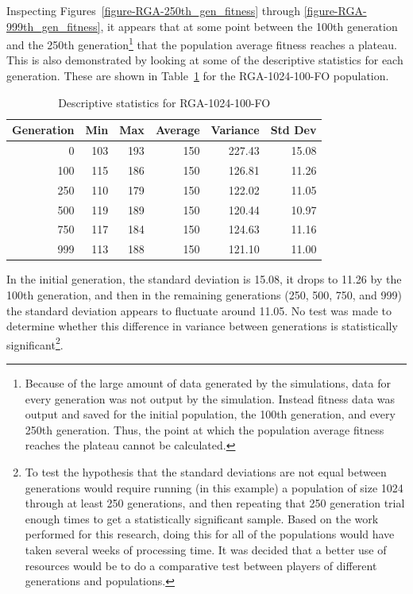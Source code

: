 Inspecting Figures~\ref{figure-RGA-250th_gen_fitness} through
\ref{figure-RGA-999th_gen_fitness}, it appears that at some point between the
100th generation and the 250th generation\footnote{Because of the large amount
of data generated by the simulations, data for every generation was not output
by the simulation. Instead fitness data was output and saved for the initial
population, the 100th generation, and every 250th generation. Thus, the point at
which the population average fitness reaches the plateau cannot be calculated.}
that the population average fitness reaches a plateau. This is also demonstrated
by looking at some of the descriptive statistics for each generation. These are
shown in Table~\ref{table-stats-for-s1024-n100-fo} for the RGA-1024-100-FO
population.

\begin{table}[ht]
\begin{center}
\caption[RGA-1024-100-FO statistics]{Descriptive statistics for RGA-1024-100-FO}
\begin{tabular}{ | r || r | r | r | r | r |}
\hline
Generation & Min & Max & Average & Variance & Std Dev \\ \hline \hline
0   & 103 & 193 & 150 & 227.43 & 15.08 \\ 
100 & 115 & 186 & 150 & 126.81 & 11.26 \\ 
250 & 110 & 179 & 150 & 122.02 & 11.05 \\ 
500 & 119 & 189 & 150 & 120.44 & 10.97 \\ 
750 & 117 & 184 & 150 & 124.63 & 11.16 \\ 
999 & 113 & 188 & 150 & 121.10 & 11.00 \\ \hline
\end{tabular}
\label{table-stats-for-s1024-n100-fo}
\end{center}
\end{table}

In the initial generation, the standard deviation is 15.08, it drops to 11.26 by
the 100th generation, and then in the remaining generations (250, 500, 750, and
999) the standard deviation appears to fluctuate around 11.05. No test was
made to determine whether this difference in variance between
generations is statistically significant\footnote{To test the hypothesis that the standard
deviations are not equal between generations would require running (in this
example) a population of size 1024 through at least 250 generations, and then
repeating that 250 generation trial enough times to get a statistically
significant sample. Based on the work performed for this research, doing this
for all of the populations would have taken several weeks of processing
time. It was decided that a better use of resources would be to do a comparative
test between players of different generations and populations.}.

